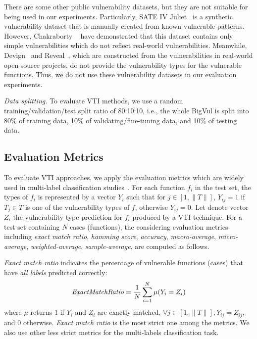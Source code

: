 There are some other public vulnerability datasets, but they are not suitable for being used in our experiments. Particularly, SATE IV Juliet~\cite{juliet} is a synthetic vulnerability dataset that is manually created from known vulnerable patterns. However, Chakraborty \etal~\cite{are_we_there} have demonstrated that this dataset contains only simple vulnerabilities which do not reflect real-world vulnerabilities. 
%
%
Meanwhile, Devign~\cite{devign} and Reveal~\cite{are_we_there}, which are constructed from the vulnerabilities in real-world open-source projects, do not provide the vulnerability types for the vulnerable functions. Thus, we do not use these vulnerability datasets in our evaluation experiments.


\textit{Data splitting.} To evaluate VTI methods, we use a random training/validation/test split ratio of 80:10:10, i.e., the whole BigVul is split into 80\% of training data, 10\% of validating/fine-tuning data, and 10\% of testing data.



\subsection{Evaluation Metrics}
To evaluate VTI approaches, we apply the evaluation metrics which are widely used in multi-label classification studies~\citep{text_multi_label}. For each function $f_i$ in the test set, the types of $f_i$ is represented by a vector $Y_i$ such that for $j \in [1,\|T\|]$, $Y_{ij} = 1$ if $T_j \in T$ is one of the vulnerability types of $f$, otherwise $Y_{ij} = 0$. Let denote vector $Z_i$ the vulnerability type prediction for $f_i$ produced by a VTI technique. For a test set containing $N$ cases (functions), the considering evaluation metrics including \textit{exact match ratio}, \textit{hamming score}, \textit{accuracy}, \textit{macro-average}, \textit{micro-average}, \textit{weighted-average}, \textit{sample-average}, are computed as follows.

\textit{Exact match ratio} indicates the percentage of vulnerable functions (cases) that have \textit{all labels} predicted correctly:
%
$$
\text{\textit{ExactMatchRatio}} = \frac{1}{N}\sum_{i=1}^{N} \mu(Y_i = Z_i)
$$
%
where $\mu$ returns $1$ if $Y_i$ and $Z_i$ are exactly matched, $\forall j \in [1,\|T\|], Y_{ij} = Z_{ij}$, and 0 otherwise. \textit{Exact match ratio} is the most strict one among the metrics. We also use other less strict metrics for the multi-labels classification task. 




